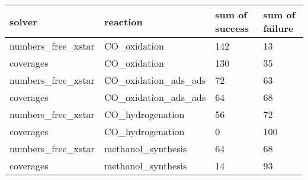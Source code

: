 \begin{tabular}{llll}
\toprule
            solver &             reaction & sum of success & sum of failure \\
\midrule
numbers\_free\_xstar &         CO\_oxidation &            142 &             13 \\
         coverages &         CO\_oxidation &            130 &             35 \\
numbers\_free\_xstar & CO\_oxidation\_ads\_ads &             72 &             63 \\
         coverages & CO\_oxidation\_ads\_ads &             64 &             68 \\
numbers\_free\_xstar &     CO\_hydrogenation &             56 &             72 \\
         coverages &     CO\_hydrogenation &              0 &            100 \\
numbers\_free\_xstar &   methanol\_synthesis &             64 &             68 \\
         coverages &   methanol\_synthesis &             14 &             93 \\
\bottomrule
\end{tabular}
